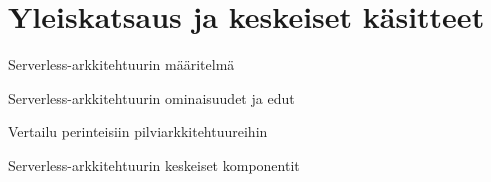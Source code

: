 \chapter{Yleiskatsaus ja keskeiset käsitteet} \label{Palvelimeton arkkitehtuuri}

Serverless-arkkitehtuurin määritelmä

Serverless-arkkitehtuurin ominaisuudet ja edut

Vertailu perinteisiin pilviarkkitehtuureihin

Serverless-arkkitehtuurin keskeiset komponentit
